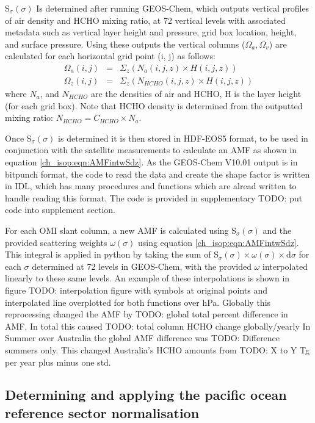     S$_\sigma(\sigma)$ Is determined after running GEOS-Chem, which outputs vertical profiles of air density and HCHO mixing ratio, at 72 vertical levels with associated metadata such as vertical layer height and pressure, grid box location, height, and surface pressure.
    Using these outputs the vertical columns ($\Omega_a, \Omega_v$) are calculated for each horizontal grid point (i, j) as follows:
    \begin{align*}
      \Omega_a(i,j) &=& \Sigma_z \left( N_a(i,j,z) \times H(i,j,z) \right)
      \\
      \Omega_z(i,j) &=& \Sigma_z \left( N_{HCHO}(i,j,z) \times H(i,j,z) \right)
    \end{align*}
    where $N_a$, and $N_{HCHO}$ are the densities of air and HCHO, H is the layer height (for each grid box).
    Note that HCHO density is determined from the outputted mixing ratio: $N_{HCHO} = C_{HCHO} \times N_a$.

    Once S$_\sigma(\sigma)$ is determined it is then stored in HDF-EOS5 format, to be used in conjunction with the satellite measurements to calculate an AMF as shown in equation \ref{ch_isop:eqn:AMFintwSdz}.
    As the GEOS-Chem V10.01 output is in bitpunch format, the code to read the data and create the shape factor is written in IDL, which has many procedures and functions which are alread written to handle reading this format. The code is provided in supplementary TODO: put code into supplement section.
    
    For each OMI slant column, a new AMF is calculated using S$_\sigma(\sigma)$ and the provided scattering weights $\omega(\sigma)$ using equation \ref{ch_isop:eqn:AMFintwSdz}.
    This integral is applied in python by taking the sum of S$_\sigma(\sigma) \times \omega(\sigma) \times \mathrm{d}\sigma$ for each $\sigma$ determined at 72 levels in GEOS-Chem, with the provided $\omega$ interpolated linearly to these same levels.
    An example of these interpolations is shown in figure TODO: interpolation figure with symbols at original points and interpolated line overplotted for both functions over hPa.
    Globally this reprocessing changed the AMF by TODO: global total percent difference in AMF. 
    In total this caused TODO: total column HCHO change globally/yearly
    In Summer over Australia the global AMF difference was TODO: Difference summers only.
    This changed Australia's HCHO amounts from TODO: X to Y Tg per year plus minus one std.
    
    
    
  \subsection{Determining and applying the pacific ocean reference sector normalisation}
    \label{ch_isop:sec:RSC}

